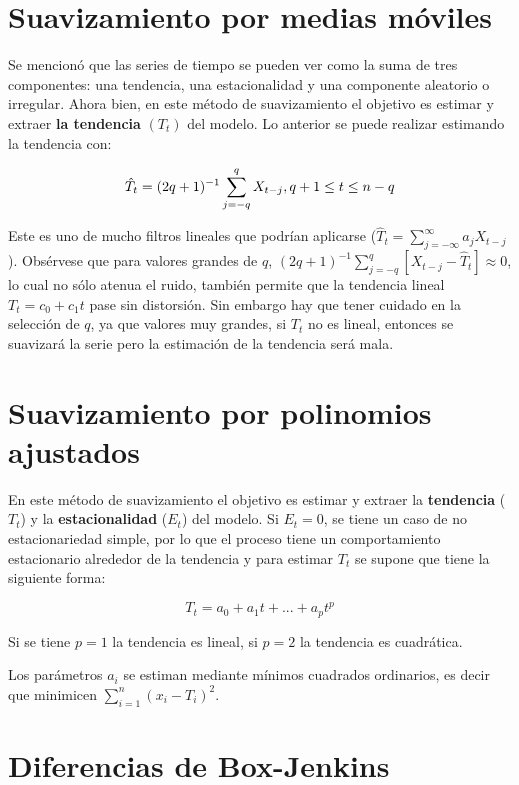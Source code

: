 \documentclass[
  a4paper,
  oneside,
  openany]{book}
\begin{document}
\hypertarget{suavizamiento-por-medias-muxf3viles}{%
\section{Suavizamiento por medias móviles}\label{suavizamiento-por-medias-muxf3viles}}

Se mencionó que las series de tiempo se pueden ver como la suma de tres componentes: una tendencia, una estacionalidad y una componente aleatorio o irregular. Ahora bien, en este método de suavizamiento el objetivo es estimar y extraer \textbf{la tendencia} \(\left(T_t\right)\) del modelo. Lo anterior se puede realizar estimando la tendencia con:

\[
\hat T_t=(2q+1)^{-1}\sum_{j=-q}^q X_{t-j},\space q+1\leq t\leq n-q
\]

Este es uno de mucho filtros lineales que podrían aplicarse (\(\hat T_t=\sum_{j=-\infty}^\infty a_jX_{t-j}\)). Obsérvese que para valores grandes de \(q\), \((2q+1)^{-1}\sum_{j=-q}^q [X_{t-j}-\hat T_t]\approx 0\), lo cual no sólo atenua el ruido, también permite que la tendencia lineal \(T_t=c_0+c_1t\) pase sin distorsión. Sin embargo hay que tener cuidado en la selección de \(q\), ya que valores muy grandes, si \(T_t\) no es lineal, entonces se suavizará la serie pero la estimación de la tendencia será mala.

\hypertarget{suavizamiento-por-polinomios-ajustados}{%
\section{Suavizamiento por polinomios ajustados}\label{suavizamiento-por-polinomios-ajustados}}

En este método de suavizamiento el objetivo es estimar y extraer la \textbf{tendencia} (\(T_t\)) y la \textbf{estacionalidad} (\(E_t\)) del modelo. Si \(E_t= 0\), se tiene un caso de no estacionariedad simple, por lo que el proceso tiene un comportamiento estacionario alrededor de la tendencia y para estimar \(T_t\) se supone que tiene la siguiente forma:

\[
T_t = a_0 + a_1t +... + a_pt^p
\]

Si se tiene \(p = 1\) la tendencia es lineal, si \(p = 2\) la tendencia es cuadrática.

Los parámetros \(a_i\) se estiman mediante mínimos cuadrados ordinarios, es decir que minimicen \(\sum_{i=1}^n (x_i-T_i)^2\).

\hypertarget{diferencias-de-box-jenkins}{%
\section{Diferencias de Box-Jenkins}\label{diferencias-de-box-jenkins}}
\end{document}
